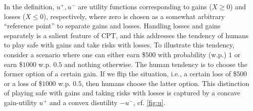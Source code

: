 In the definition, $u^+, u^-$ are utility functions corresponding to gains ($X \ge 0$) and losses ($X \le 0$), respectively,
where zero is chosen as a somewhat arbitrary ``reference point'' to separate gains and losses.
Handling losses and gains separately is a salient feature of CPT, and this addresses the tendency of humans to play safe with gains and take risks with losses. %
To illustrate this tendency, 
consider a scenario where one can either earn \$$500$ with probability (w.p.) $1$ or earn \$$1000$ w.p. $0.5$ and nothing otherwise. 
The human tendency is to choose the former option of a certain gain. 
If we flip the situation, i.e., a certain loss of \$$500$ or a loss of \$$1000$ w.p. $0.5$, 
then humans choose the latter option.  
This distinction of playing safe with gains and taking risks with losses is captured by a concave gain-utility
$u^+$ and a convex disutility $-u^-$, cf. \cref{fig:u}.

